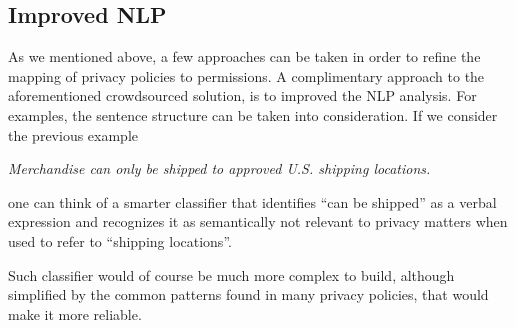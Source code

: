 \documentclass[twoside,letterpaper]{soups}
\theoremstyle{definition}
\begin{document}
\subsection{Improved NLP}
As we mentioned above, a few approaches can be taken in order to refine the mapping of privacy policies to permissions. A complimentary approach to the aforementioned crowdsourced solution, is to improved the NLP analysis. For examples, the sentence structure can be taken into consideration. If we consider the previous example

\emph{Merchandise can only be shipped to approved U.S. shipping locations.}

one can think of a smarter classifier that identifies ``can be shipped'' as a verbal expression and recognizes it as semantically not relevant to privacy matters when used to refer to ``shipping locations''.

Such classifier would of course be much more complex to build, although simplified by the common patterns found in many privacy policies, that would make it more reliable.

%

%
%
\end{document}
